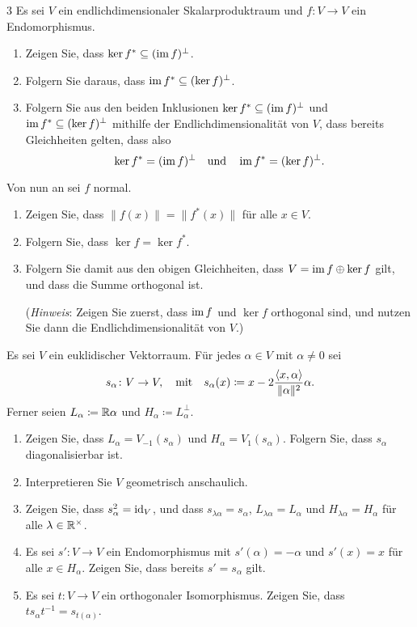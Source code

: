 \begin{question}[subtitle = Bilder und Kerne adjungierter und normaler Endomorphismen]{3}
  Es sei $V$ ein endlichdimensionaler Skalarproduktraum und $f \colon V \to V$ ein Endomorphismus.
  \begin{enumerate}[leftmargin=*]
    \item
      Zeigen Sie, dass $\ker f^* \subseteq (\operatorname{im} f)^\perp$.
    \item
      Folgern Sie daraus, dass $\operatorname{im} f^* \subseteq (\ker f)^\perp$.
    \item
      Folgern Sie aus den beiden Inklusionen $\ker f^* \subseteq (\operatorname{im} f)^\perp$ und $\operatorname{im} f^* \subseteq (\ker f)^\perp$ mithilfe der Endlichdimensionalität von $V$, dass bereits Gleichheiten gelten, dass also
      \[
        \ker f^* = (\operatorname{im} f)^\perp
        \quad\text{und}\quad
        \operatorname{im} f^* = (\ker f)^\perp.
      \]
  \end{enumerate}
  Von nun an sei $f$ normal.
  \begin{enumerate}[leftmargin=*, resume]
    \item
      Zeigen Sie, dass $\|f(x)\| = \|f^*(x)\|$ für alle $x \in V$.
    \item
      Folgern Sie, dass $\ker f = \ker f^*$.
    \item
      Folgern Sie damit aus den obigen Gleichheiten, dass $V = \operatorname{im} f \oplus \ker f$ gilt, und dass die Summe orthogonal ist.
      
      (\emph{Hinweis}:
       Zeigen Sie zuerst, dass $\operatorname{im} f$ und $\ker f$ orthogonal sind, und nutzen Sie dann die Endlichdimensionalität von $V$.)
  \end{enumerate}
\end{question}


\begin{question}[subtitle = Spiegelungen]{3}
  Es sei $V$ ein euklidischer Vektorraum.
  Für jedes $\alpha \in V$ mit $\alpha \neq 0$ sei
  \[
    s_\alpha \colon V \to V,
    \quad\text{mit}\quad
              s_\alpha(x)
    \coloneqq x - 2 \frac{\left\langle x, \alpha \right\rangle}{\|\alpha\|^2} \alpha.
  \]
  Ferner seien $L_\alpha \coloneqq \mathbb{R} \alpha$ und $H_\alpha \coloneqq L_\alpha^\perp$.
  \begin{enumerate}[leftmargin=*]
    \item
      Zeigen Sie, dass $L_\alpha = V_{-1}(s_\alpha)$ und $H_\alpha = V_1(s_\alpha)$.
      Folgern Sie, dass $s_\alpha$ diagonalisierbar ist.
    \item
      Interpretieren Sie $V$ geometrisch anschaulich.
    \item
      Zeigen Sie, dass $s_\alpha^2 = \operatorname{id}_V$, und dass $s_{\lambda \alpha} = s_\alpha$, $L_{\lambda \alpha} = L_\alpha$ und $H_{\lambda \alpha} = H_\alpha$ für alle $\lambda \in \mathbb{R}^\times$.
    \item
      Es sei $s' \colon V \to V$ ein Endomorphismus mit $s'(\alpha) = -\alpha$ und $s'(x) = x$ für alle $x \in H_\alpha$.
      Zeigen Sie, dass bereits $s' = s_\alpha$ gilt.
    \item
      Es sei $t \colon V \to V$ ein orthogonaler Isomorphismus. Zeigen Sie, dass $t s_\alpha t^{-1} = s_{t(\alpha)}$.
  \end{enumerate}
\end{question}


